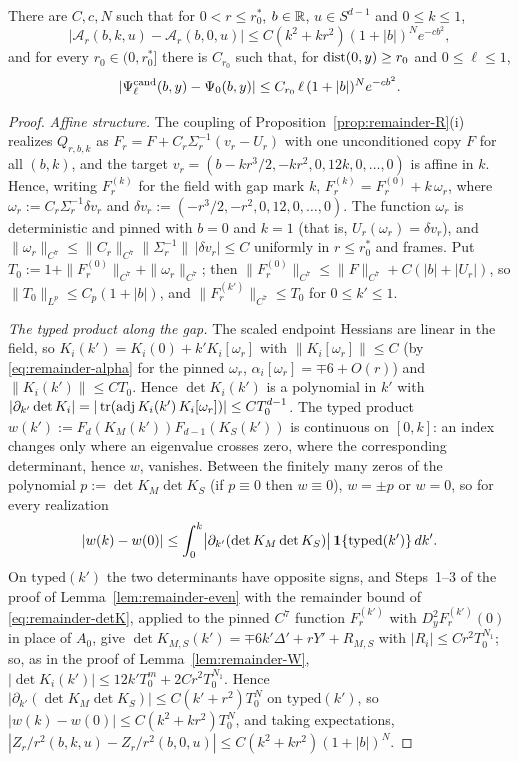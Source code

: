 \begin{lemma}\label{lem:cusp-lipschitz}
There are $C,c,N$ such that for $0<r\le r_0^*$, $b\in\mathbb R$, $u\in S^{d-1}$ and $0\le k\le1$,
\begin{equation}\label{eq:cusp-L1}
|\mathcal A_r(b,k,u)-\mathcal A_r(b,0,u)|\le C(k^2+kr^2)(1+|b|)^Ne^{-cb^2},
\end{equation}
and for every $r_0\in(0,r_0^*]$ there is $C_{r_0}$ such that, for $\operatorname{dist}(0,y)\ge r_0$ and $0\le\ell\le1$,
\begin{equation}\label{eq:cusp-L2}
|\Psi^{\mathrm{cand}}_\ell(b,y)-\Psi_0(b,y)|\le C_{r_0}\,\ell\,(1+|b|)^Ne^{-cb^2}.
\end{equation}
\end{lemma}

\begin{proof}
\emph{Affine structure.} The coupling of Proposition~\ref{prop:remainder-R}(i) realizes $Q_{r,b,k}$ as $F_r=F+C_r\Sigma_r^{-1}(v_r-U_r)$ with one unconditioned copy $F$ for all $(b,k)$, and the target $v_r=(b-kr^3/2,-kr^2,0,12k,0,\dots,0)$ is affine in $k$. Hence, writing $F_r^{(k)}$ for the field with gap mark $k$, $F_r^{(k)}=F_r^{(0)}+k\,\omega_r$, where $\omega_r:=C_r\Sigma_r^{-1}\delta v_r$ and $\delta v_r:=(-r^3/2,-r^2,0,12,0,\dots,0)$. The function $\omega_r$ is deterministic and pinned with $b=0$ and $k=1$ (that is, $U_r(\omega_r)=\delta v_r$), and $\|\omega_r\|_{C^7}\le\|C_r\|_{C^7}\|\Sigma_r^{-1}\|\,|\delta v_r|\le C$ uniformly in $r\le r_0^*$ and frames. Put $T_0:=1+\|F_r^{(0)}\|_{C^7}+\|\omega_r\|_{C^7}$; then $\|F_r^{(0)}\|_{C^7}\le\|F\|_{C^7}+C(|b|+|U_r|)$, so $\|T_0\|_{L^p}\le C_p(1+|b|)$, and $\|F_r^{(k')}\|_{C^7}\le T_0$ for $0\le k'\le1$.

\emph{The typed product along the gap.} The scaled endpoint Hessians are linear in the field, so $K_i(k')=K_i(0)+k'K_i[\omega_r]$ with $\|K_i[\omega_r]\|\le C$ (by \eqref{eq:remainder-alpha} for the pinned $\omega_r$, $\alpha_i[\omega_r]=\mp6+O(r)$) and $\|K_i(k')\|\le CT_0$. Hence $\det K_i(k')$ is a polynomial in $k'$ with $|\partial_{k'}\det K_i|=|\operatorname{tr}(\operatorname{adj} K_i(k')\,K_i[\omega_r])|\le CT_0^{d-1}$. The typed product $w(k'):=F_d(K_M(k'))F_{d-1}(K_S(k'))$ is continuous on $[0,k]$: an index changes only where an eigenvalue crosses zero, where the corresponding determinant, hence $w$, vanishes. Between the finitely many zeros of the polynomial $p:=\det K_M\det K_S$ (if $p\equiv0$ then $w\equiv0$), $w=\pm p$ or $w=0$, so for every realization
\[
|w(k)-w(0)|\le\int_0^k\bigl|\partial_{k'}(\det K_M\det K_S)\bigr|\,\mathbf 1\{\mathrm{typed}(k')\}\,dk' .
\]
On $\mathrm{typed}(k')$ the two determinants have opposite signs, and Steps~1--3 of the proof of Lemma~\ref{lem:remainder-even} with the remainder bound of \eqref{eq:remainder-detK}, applied to the pinned $C^7$ function $F_r^{(k')}$ with $D_y^2F_r^{(k')}(0)$ in place of $A_0$, give $\det K_{M,S}(k')=\mp6k'\Delta'+rY'+R_{M,S}$ with $|R_i|\le Cr^2T_0^{N_1}$; so, as in the proof of Lemma~\ref{lem:remainder-W}, $|\det K_i(k')|\le12k'T_0^m+2Cr^2T_0^{N_1}$. Hence $|\partial_{k'}(\det K_M\det K_S)|\le C(k'+r^2)T_0^N$ on $\mathrm{typed}(k')$, so $|w(k)-w(0)|\le C(k^2+kr^2)T_0^N$, and taking expectations, $|Z_r/r^2(b,k,u)-Z_r/r^2(b,0,u)|\le C(k^2+kr^2)(1+|b|)^N$.


\end{proof}
